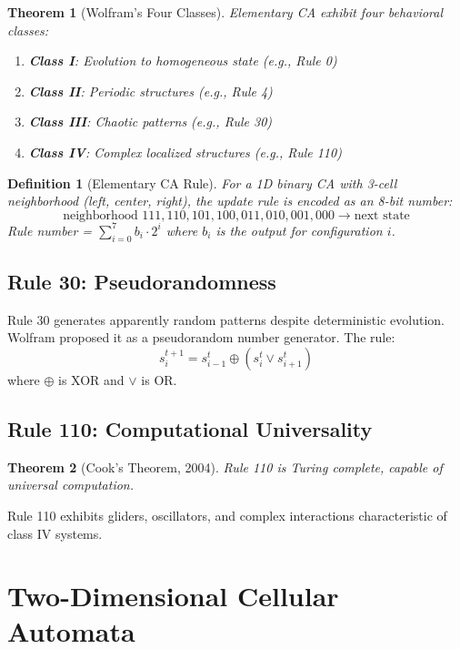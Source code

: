 \documentclass[a4paper, 11pt]{article}
\newtheorem{definition}{Definition}[section]
\newtheorem{theorem}{Theorem}[section]
\begin{document}
\begin{theorem}[Wolfram's Four Classes]
Elementary CA exhibit four behavioral classes:
\begin{enumerate}
\item \textbf{Class I}: Evolution to homogeneous state (e.g., Rule 0)
\item \textbf{Class II}: Periodic structures (e.g., Rule 4)
\item \textbf{Class III}: Chaotic patterns (e.g., Rule 30)
\item \textbf{Class IV}: Complex localized structures (e.g., Rule 110)
\end{enumerate}
\end{theorem}

\begin{definition}[Elementary CA Rule]
For a 1D binary CA with 3-cell neighborhood (left, center, right), the update rule is
encoded as an 8-bit number:
\begin{equation}
\text{neighborhood } 111, 110, 101, 100, 011, 010, 001, 000 \to \text{next state}
\end{equation}
Rule number = $\sum_{i=0}^{7} b_i \cdot 2^i$ where $b_i$ is the output for configuration $i$.
\end{definition}

\subsection{Rule 30: Pseudorandomness}

Rule 30 generates apparently random patterns despite deterministic evolution. Wolfram
proposed it as a pseudorandom number generator. The rule:
\begin{equation}
s_i^{t+1} = s_{i-1}^t \oplus (s_i^t \vee s_{i+1}^t)
\end{equation}
where $\oplus$ is XOR and $\vee$ is OR.

\subsection{Rule 110: Computational Universality}

\begin{theorem}[Cook's Theorem, 2004]
Rule 110 is Turing complete, capable of universal computation.
\end{theorem}

Rule 110 exhibits gliders, oscillators, and complex interactions characteristic of
class IV systems.

\section{Two-Dimensional Cellular Automata}
\end{document}
